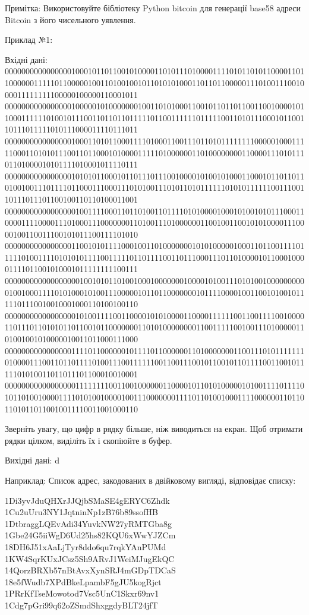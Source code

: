\documentclass[]{article}
\begin{document}
\begin{enumerate}
Примітка:
Використовуйте бібліотеку Python bitcoin для генерації base58 адреси Bitcoin з його чисельного уявлення.

Приклад №1:

Вхідні дані: 
00000000000000001000101101100101000011010111010000111101011010110000110110000001111101100000100110100100101101010100011011011000001110100111001000011111111100000100000110001011
00000000000000001000001010000000100110101000110010110110110011001000010110001111110100101110011011011011111011001111110111110011010111000101100110111011111010111000011110111011
00000000000000001000110101100011110100011001110110101111111100000100011111000110101011100110110001010000111110100000011010000000011000011101011101101000010101111010001011110111
00000000000000001010101100010110111011100100001010010100011000101101101101001001110111101100011100011101010011101011010111111010101111110011100110111011101100100110110100011001
00000000000000000100111100011011010011011110101000010001010010101110001100001111000011101000111000000011010011101000000110010011001010100001110000100110011100101011100111101010
00000000000000001100101011110001001101000000010101000001000110110011110111110100111101010101111001111101101111001101110001110110100001011000100001111011001010001011111111100111
00000000000000000010010101101001000100000001000010100111010100100000000001001000111101010001010011100000101101100000001011110000100110010100101111101110010010001000110100100110
00000000000000000101001111001100001010100001100001111110011001111001000011011101101010110110010110000000110101000000001100111110010011101000001101001001010000010011011000111000
00000000000000001111011000000101111011000000110100000001100111010111111101000011100110110111101001110011111100110011100101100101101111001100101111101010011011011101100010010001
00000000000000000111111110011001000000110000101101010000010100111101111010110100100001111010100100001001110000000111101101001000111100000011011011010110110010011110011001000110

Зверніть увагу, що цифр в рядку більше, ніж виводиться на екран. 
Щоб отримати рядки цілком, виділіть їх і скопіюйте в буфер.

Вихідні дані:
d

Наприклад:
Список адрес, закодованих в двійковому вигляді, відповідає списку: 

1Di3yvJduQHXrJJQjbSMaSE4gERYC6Zhdk
1Cu2uUru3NY1JqtninNp1zB76b89ssofHB
1DtbraggLQEvAdi34YuvkNW27yRMTGba8g
1Gbe24G5iiWgD6Ud25hs82KQU6xWwYJZCm
18DH6J51xAaLjTyr8ddo6qu7rqkYAnPUMd
1KW4SqrKUxJCsz5Sh9ARvJ1WeiMJugEkQC
14QorzBRXb57nBtAvxXynSRJ4mGDpTDCaS
18e5fWudb7XPdBkeLpambF5gJU5kogRjct
1PRrKfTseMowotod7Vsc5UnC1Skxr69nv1
1Cdg7pGri99q62oZSmdShxggdyBLT24jfT


\end{enumerate}
\end{document}
